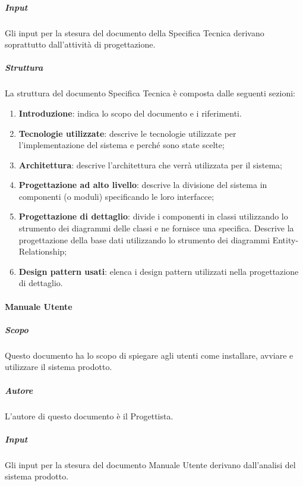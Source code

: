 \subparagraph{Input}
Gli input per la stesura del documento della Specifica Tecnica derivano soprattutto dall'attività di progettazione.

\subparagraph{Struttura}
\label{subsec:struttura_specifica}
La struttura del documento Specifica Tecnica è composta dalle seguenti sezioni:
\begin{enumerate}
    \item \textbf{Introduzione}: indica lo scopo del documento e i riferimenti. 

    \item \textbf{Tecnologie utilizzate}: descrive le tecnologie utilizzate per l'implementazione del sistema e perché sono state scelte;

    \item \textbf{Architettura}: descrive l'architettura che verrà utilizzata per il sistema;

    \item \textbf{Progettazione ad alto livello}: descrive la divisione del sistema in componenti (o moduli) specificando le loro interfacce;

    \item \textbf{Progettazione di dettaglio}: divide i componenti in classi utilizzando lo strumento dei diagrammi delle classi e ne fornisce una specifica.
    Descrive la progettazione della base dati utilizzando lo strumento dei diagrammi Entity-Relationship;

    \item \textbf{Design pattern usati}: elenca i design pattern utilizzati nella progettazione di dettaglio.

\end{enumerate}


\paragraph{Manuale Utente}

\subparagraph{Scopo}
Questo documento ha lo scopo di spiegare agli utenti come installare, avviare e utilizzare il sistema prodotto.

\subparagraph{Autore} 
L'autore di questo documento è il Progettista.

\subparagraph{Input}
Gli input per la stesura del documento Manuale Utente derivano dall'analisi del sistema prodotto.

